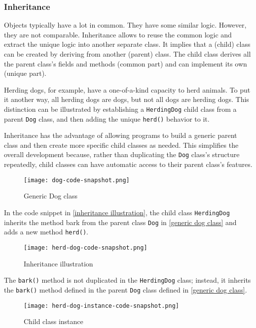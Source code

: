 \subsubsection{Inheritance}
Objects typically have a lot in common. They have some similar logic. However, they are not comparable. Inheritance allows to reuse the common logic and extract the unique logic into another separate class. It implies that a (child) class can be created by deriving from another (parent) class. The child class derives all the parent class's fields and methods (common part) and can implement its own (unique part).

Herding dogs, for example, have a one-of-a-kind capacity to herd animals. To put it another way, all herding dogs are dogs, but not all dogs are herding dogs. This distinction can be illustrated by establishing a \verb+HerdingDog+ child class from a parent \verb+Dog+ class, and then adding the unique \verb+herd()+ behavior to it.

Inheritance has the advantage of allowing programs to build a generic parent class and then create more specific child classes as needed. This simplifies the overall development because, rather than duplicating the \verb+Dog+ class's structure repeatedly, child classes can have automatic access to their parent class's features.
\begin{figure}[H]
  \centering
  \texttt{[image: dog-code-snapshot.png]}
  \caption{Generic Dog class}
  \label{generic dog class}
\end{figure}

In the code snippet in \autoref{inheritance illustration}, the child class \verb+HerdingDog+ inherits the method bark from the parent class \verb+Dog+ in \autoref{generic dog class} and adds a new method \verb+herd()+.
\begin{figure}[H]
  \centering
  \texttt{[image: herd-dog-code-snapshot.png]}
  \caption{Inheritance illustration}
  \label{inheritance illustration}
\end{figure}

The \verb+bark()+ method is not duplicated in the \verb+HerdingDog+ class; instead, it inherits the \verb+bark()+ method defined in the parent \verb+Dog+ class defined in \autoref{generic dog class}.

\begin{figure}[H]
  \centering
  \texttt{[image: herd-dog-instance-code-snapshot.png]}
  \caption{Child class instance}
  \label{child class instance}
\end{figure}

